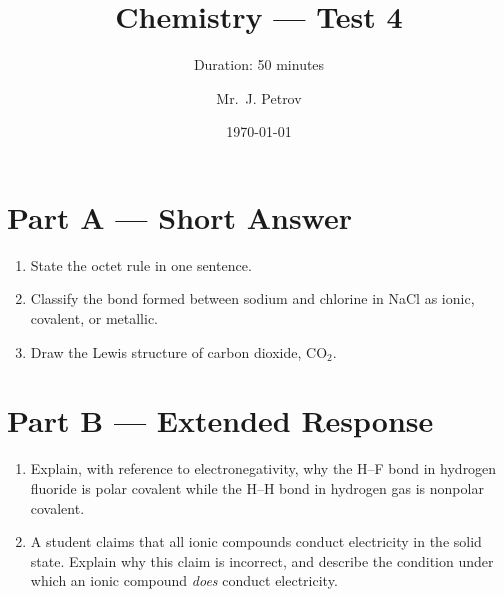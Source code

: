 \documentclass[a4paper,11pt]{article}
\title[Chemical Bonding]{Chemistry --- Test 4}
\subtitle{Duration: 50 minutes}
\author{Mr.\ J. Petrov}
\date{\today}
\begin{document}
\maketitle

\section*{Part A --- Short Answer}

\begin{enumerate}[label=\arabic*.]
  \item State the octet rule in one sentence.

  \item Classify the bond formed between sodium and chlorine in NaCl as
    ionic, covalent, or metallic.

  \item Draw the Lewis structure of carbon dioxide, CO$_2$.
\end{enumerate}

\section*{Part B --- Extended Response}

\begin{enumerate}[resume,label=\arabic*.]
  \item Explain, with reference to electronegativity, why the H--F bond
    in hydrogen fluoride is polar covalent while the H--H bond in
    hydrogen gas is nonpolar covalent.

  \item A student claims that all ionic compounds conduct electricity in
    the solid state. Explain why this claim is incorrect, and describe
    the condition under which an ionic compound \emph{does} conduct
    electricity.
\end{enumerate}
\end{document}
